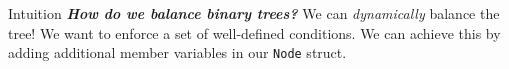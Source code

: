 \documentclass[aspectratio=169]{beamer}
\newcommand{\textib}[1]{\textit{\textbf{{#1}}}}
\begin{document}
\begin{frame}{Intuition}
    \textib{How do we balance binary trees?}
    \newline
    \newline
     {
        We can \textit{dynamically} balance the tree!
    }
    \newline
    \newline
     {
        We want to enforce a set of well-defined conditions. We can achieve this by adding
        additional member variables in our \texttt{Node} struct.
    }
\end{frame}

\end{document}
